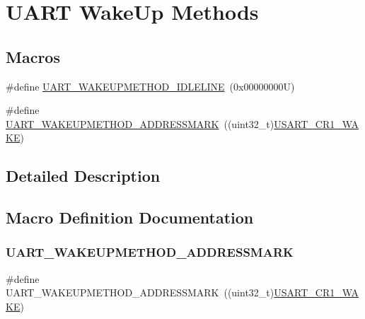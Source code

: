 \hypertarget{group___u_a_r_t___wake_up___methods}{}\section{U\+A\+RT Wake\+Up Methods}
\label{group___u_a_r_t___wake_up___methods}
\subsection*{Macros}
\begin{DoxyCompactItemize}
\item 
\#define \hyperlink{group___u_a_r_t___wake_up___methods_ga2411ed44c5d82db84c5819e1e2b5b8b3}{U\+A\+R\+T\+\_\+\+W\+A\+K\+E\+U\+P\+M\+E\+T\+H\+O\+D\+\_\+\+I\+D\+L\+E\+L\+I\+NE}~(0x00000000\+U)
\item 
\#define \hyperlink{group___u_a_r_t___wake_up___methods_ga4c6935f26f8f2a9fe70fd6306a9882cb}{U\+A\+R\+T\+\_\+\+W\+A\+K\+E\+U\+P\+M\+E\+T\+H\+O\+D\+\_\+\+A\+D\+D\+R\+E\+S\+S\+M\+A\+RK}~((uint32\+\_\+t)\hyperlink{group___peripheral___registers___bits___definition_gad831dfc169fcf14b7284984dbecf322d}{U\+S\+A\+R\+T\+\_\+\+C\+R1\+\_\+\+W\+A\+KE})
\end{DoxyCompactItemize}


\subsection{Detailed Description}


\subsection{Macro Definition Documentation}
\mbox{\label{group___u_a_r_t___wake_up___methods_ga4c6935f26f8f2a9fe70fd6306a9882cb}} 
\subsubsection{\texorpdfstring{U\+A\+R\+T\+\_\+\+W\+A\+K\+E\+U\+P\+M\+E\+T\+H\+O\+D\+\_\+\+A\+D\+D\+R\+E\+S\+S\+M\+A\+RK}{UART\_WAKEUPMETHOD\_ADDRESSMARK}}
{\footnotesize\ttfamily \#define U\+A\+R\+T\+\_\+\+W\+A\+K\+E\+U\+P\+M\+E\+T\+H\+O\+D\+\_\+\+A\+D\+D\+R\+E\+S\+S\+M\+A\+RK~((uint32\+\_\+t)\hyperlink{group___peripheral___registers___bits___definition_gad831dfc169fcf14b7284984dbecf322d}{U\+S\+A\+R\+T\+\_\+\+C\+R1\+\_\+\+W\+A\+KE})}

